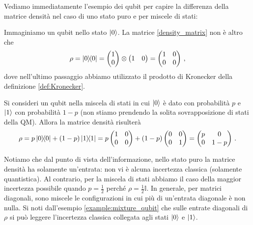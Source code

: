 \noindent Vediamo immediatamente l'esempio dei qubit per capire la differenza della matrice densità nel caso di uno stato puro e per miscele di stati:

\begin{esempio}
    Immaginiamo un qubit nello stato $\ket{0}$. La matrice \eqref{density_matrix} non è altro che
    \begin{equation*}
        \rho = \ketbra{0} = 
        \begin{pmatrix}
            1 \\ 0
        \end{pmatrix} \otimes 
        \begin{pmatrix}
            1 & 0
        \end{pmatrix} 
        = 
        \begin{pmatrix}
            1 & 0 \\ 0 & 0
        \end{pmatrix} \, ,
    \end{equation*}
    dove nell'ultimo passaggio abbiamo utilizzato il prodotto di Kronecker della definizione \ref{def:Kronecker}.
\end{esempio}

\begin{esempio}\label{example:mixture_qubit}
    Si consideri un qubit nella miscela di stati in cui $\ket{0}$ è dato con probabilità $p$ e $\ket{1}$ con probabilità $1-p$ (non stiamo prendendo la solita sovrapposizione di stati della QM). Allora la matrice densità risulterà
    \begin{equation*}
        \rho = p \ketbra{0} + (1-p) \ketbra{1} = p 
        \begin{pmatrix}
            1 & 0 \\ 0 & 0
        \end{pmatrix} + 
        (1-p)
        \begin{pmatrix}
            0 & 0 \\ 0 & 1
        \end{pmatrix}
        =
        \begin{pmatrix}
            p & 0 \\ 0 & 1-p
        \end{pmatrix} \, .
    \end{equation*} 
\end{esempio}

\noindent Notiamo che dal punto di vista dell'informazione, nello stato puro la matrice densità ha solamente un'entrata: non vi è alcuna incertezza classica (solamente quantistica). Al contrario, per la miscela di stati abbiamo il caso della maggior incertezza possibile quando $p = \frac{1}{2}$ perché $\rho = \frac{1}{2} \mathbb{I}$. In generale, per matrici diagonali,  sono miscele le configurazioni in cui pi\`u di un'entrata diagonale \`e non nulla. Si noti dall'esempio \ref{example:mixture_qubit} che sulle entrate diagonali di $\rho$ si può leggere l'incertezza classica collegata agli stati $\ket{0}$ e $\ket{1}$. 

